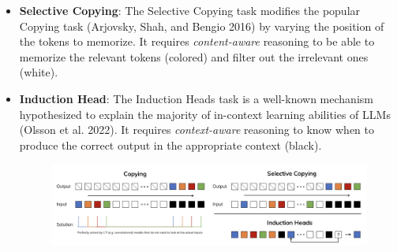\documentclass{article}
\theoremstyle{definition}
\begin{document}
\begin{itemize}
    \item \textbf{Selective Copying}: The Selective Copying task modifies the popular Copying task (Arjovsky, Shah, and Bengio 2016) by varying the
    position of the tokens to memorize. It requires \textit{content-aware} reasoning to be able to memorize the relevant tokens
    (colored) and filter out the irrelevant ones (white).
    \item \textbf{Induction Head}: The Induction Heads task is a well-known mechanism hypothesized to explain the majority of in-context learning
    abilities of LLMs (Olsson et al. 2022). It requires \textit{context-aware}  reasoning to know when to produce the correct output in
    the appropriate context (black).

    \vspace{-5mm}
    \begin{figure}[H]
        \centering
        \includegraphics[scale=0.35]{synthetictask.png} %
       
        \label{fig:myimage}
    \end{figure}
\end{itemize}
  \vspace{-11mm}
  
\end{document}
